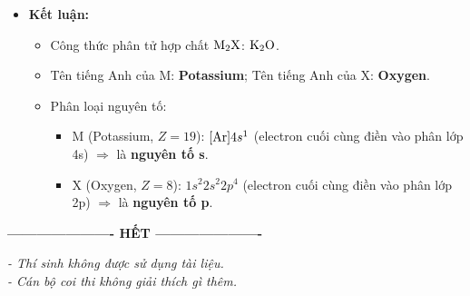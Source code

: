 \documentclass[11pt,a4paper]{article}
\begin{document}
\begin{ex}
\begin{loigiai}
\begin{itemize}[leftmargin=0.8cm]
Số khối: $A_\text{M} = 19 + 20 = 39$; $A_\text{X} = 8 + 8 = 16$.
\item \textbf{Kết luận:}
\begin{itemize}
\item Công thức phân tử hợp chất $\ce{M2X}$: \textbf{$\ce{K2O}$}.
\item Tên tiếng Anh của M: \textbf{Potassium}; Tên tiếng Anh của X: \textbf{Oxygen}.
\item Phân loại nguyên tố:
\begin{itemize}
\item M (Potassium, $Z = 19$): $[\ce{Ar}]4s^1$ (electron cuối cùng điền vào phân lớp 4s) $\Rightarrow$ là \textbf{nguyên tố s}.
\item X (Oxygen, $Z = 8$): $1s^2 2s^2 2p^4$ (electron cuối cùng điền vào phân lớp 2p) $\Rightarrow$ là \textbf{nguyên tố p}.
\end{itemize}
\end{itemize}
\end{itemize}
\end{loigiai}
\end{ex}

\vspace{8pt}
\begin{center}
\textbf{---------------------- HẾT ----------------------}
\end{center}
\begin{center}
\textit{\small - Thí sinh không được sử dụng tài liệu.\\ - Cán bộ coi thi không giải thích gì thêm.}
\end{center}
\end{document}
